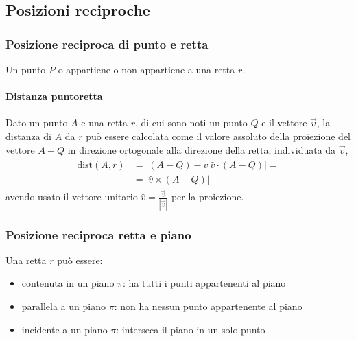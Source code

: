 \documentclass[letterpaper,10pt,english]{jupyterBook}
\begin{document}
\subsection{Posizioni reciproche}
\label{\detokenize{ch/analytic_geometry/analytic_geometry_3d/lines:posizioni-reciproche}}

\subsubsection{Posizione reciproca di punto e retta}
\label{\detokenize{ch/analytic_geometry/analytic_geometry_3d/lines:posizione-reciproca-di-punto-e-retta}}
\sphinxAtStartPar
Un punto \(P\) o appartiene o non appartiene a una retta \(r\).


\paragraph{Distanza punto\sphinxhyphen{}retta}
\label{\detokenize{ch/analytic_geometry/analytic_geometry_3d/lines:distanza-punto-retta}}
\sphinxAtStartPar
Dato un punto \(A\) e una retta \(r\), di cui sono noti un punto \(Q\) e il vettore \(\vec{v}\), la distanza di \(A\) da \(r\) può essere calcolata come il valore assoluto della proiezione del vettore \(A-Q\) in direzione ortogonale alla direzione della retta, individuata da \(\vec{v}\),
\begin{equation*}
\begin{split}\begin{aligned}
\text{dist}(A,r) & = \left| (A-Q) - \hat{v} \ \hat{v} \cdot (A-Q) \right| = \\ 
                 & = \left| \hat{v} \times (A-Q) \right| 
\end{aligned}\end{split}
\end{equation*}
\sphinxAtStartPar
avendo usato il vettore unitario \(\hat{v} = \frac{\vec{v}}{|\vec{v}|}\) per la proiezione.


\subsubsection{Posizione reciproca retta e piano}
\label{\detokenize{ch/analytic_geometry/analytic_geometry_3d/lines:posizione-reciproca-retta-e-piano}}
\sphinxAtStartPar
Una retta \(r\) può essere:
\begin{itemize}
\item {} 
\sphinxAtStartPar
contenuta in un piano \(\pi\): ha tutti i punti appartenenti al piano

\item {} 
\sphinxAtStartPar
parallela a un piano \(\pi\): non ha nessun punto appartenente al piano

\item {} 
\sphinxAtStartPar
incidente a un piano \(\pi\): interseca il piano in un solo punto

\end{itemize}
\end{document}

